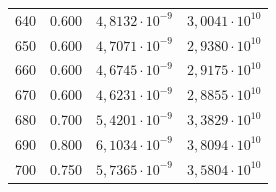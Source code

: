 \begin{table}[H]
\begin{tabular}{S[table-format=3.0] S[table-format=1.3] S  S}
      640            &         0.600        &       {$4,8132 \cdot 10^{-9}$}        &       {$3,0041 \cdot 10^{10}$}       \\
      650            &         0.600        &       {$4,7071 \cdot 10^{-9}$}        &       {$2,9380 \cdot 10^{10}$}       \\
      660            &         0.600        &       {$4,6745 \cdot 10^{-9}$}        &       {$2,9175 \cdot 10^{10}$}       \\
      670            &         0.600        &       {$4,6231 \cdot 10^{-9}$}        &       {$2,8855 \cdot 10^{10}$}       \\
      680            &         0.700        &       {$5,4201 \cdot 10^{-9}$}        &       {$3,3829 \cdot 10^{10}$}       \\
      690            &         0.800        &       {$6,1034 \cdot 10^{-9}$}        &       {$3,8094 \cdot 10^{10}$}       \\
      700            &         0.750        &       {$5,7365 \cdot 10^{-9}$}        &       {$3,5804 \cdot 10^{10}$}       \\ 
    \bottomrule
    \end{tabular}
\end{table}
